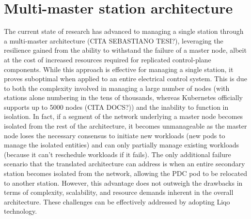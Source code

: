 \section{Multi-master station architecture}
The current state of research has advanced to managing a single station through a multi-master architecture (CITA SEBASTIANO TESI?), leveraging the resilience gained from the ability to withstand the failure of a master node, albeit at the cost of increased resources required for replicated control-plane components. While this approach is effective for managing a single station, it proves suboptimal when applied to an entire electrical control system. This is due to both the complexity involved in managing a large number of nodes (with stations alone numbering in the tens of thousands, whereas Kubernetes officially supports up to 5000 nodes (CITA DOCS?)) and the inability to function in isolation. In fact, if a segment of the network underlying a master node becomes isolated from the rest of the architecture, it becomes unmanageable as the master node loses the necessary consensus to initiate new workloads (new pods to manage the isolated entities) and can only partially manage existing workloads (because it can't reschedule workloads if it fails).
The only additional failure scenario that the translated architecture can address is when an entire secondary station becomes isolated from the network, allowing the PDC pod to be relocated to another station. However, this advantage does not outweigh the drawbacks in terms of complexity, scalability, and resource demands inherent in the overall architecture. These challenges can be effectively addressed by adopting Liqo technology.